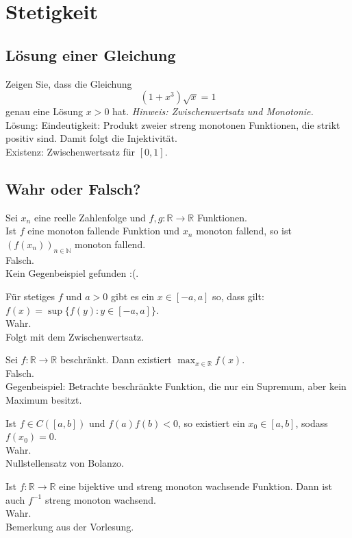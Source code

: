\section{Stetigkeit}
\subsection{Lösung einer Gleichung}
Zeigen Sie, dass die Gleichung
\begin{displaymath}
  (1+x^3)\sqrt{x} = 1
\end{displaymath}
genau eine Lösung $x > 0$ hat. \textit{Hinweis: Zwischenwertsatz und Monotonie.}\\
Lösung: Eindeutigkeit: Produkt zweier streng monotonen Funktionen, die strikt positiv sind.
Damit folgt die Injektivität.\\
Existenz: Zwischenwertsatz für $[0,1]$.

\subsection{Wahr oder Falsch?}
Sei $x_n$ eine reelle Zahlenfolge und $f,g : \mathbb{R} \to \mathbb{R}$ Funktionen.\\
Ist $f$ eine monoton fallende Funktion und $x_n$ monoton fallend, so ist $(f(x_n))_{n \in \mathbb{N}}$ monoton fallend.\\
Falsch.\\
Kein Gegenbeispiel gefunden :(.

Für stetiges $f$ und $a > 0$ gibt es ein $x \in [-a,a]$ so, dass gilt: $f(x) = \sup\{f(y) : y \in [-a,a]\}$.\\
Wahr.\\
Folgt mit dem Zwischenwertsatz.

Sei $f : \mathbb{R} \to \mathbb{R}$ beschränkt.
Dann existiert $\max_{x \in \mathbb{R}} f(x)$.\\
Falsch.\\
Gegenbeispiel: Betrachte beschränkte Funktion, die nur ein Supremum, aber kein Maximum besitzt.

Ist $f \in C([a,b])$ und $f(a)f(b) < 0$, so existiert ein $x_0 \in [a,b]$, sodass $f(x_0) = 0$.\\
Wahr.\\
Nullstellensatz von Bolanzo.

Ist $f : \mathbb{R} \to \mathbb{R}$ eine bijektive und streng monoton wachsende Funktion.
Dann ist auch $f^{-1}$ streng monoton wachsend.\\
Wahr.\\
Bemerkung aus der Vorlesung.

